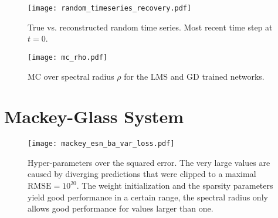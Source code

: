 \begin{figure}
  \begin{minipage}[t]{.48\textwidth}
    \texttt{[image: random\_timeseries\_recovery.pdf]}
    \caption{
      True vs. reconstructed random time series. Most recent time step at $t=0$.
    }
    \label{fig:random_timeseries_recovery}
  \end{minipage}
  \hspace{.02\textwidth}
  \begin{minipage}[t]{.48\textwidth}
    \texttt{[image: mc\_rho.pdf]}
    \caption{MC over spectral radius $\rho$ for the LMS and GD trained networks.}
    \label{fig:mc_rho}
  \end{minipage}
\end{figure}



\newpage
\section{Mackey-Glass System}%
\label{sec:res_mackey_glass_system}

\begin{figure}
  \centering
  \texttt{[image: mackey\_esn\_ba\_var\_loss.pdf]}
  \caption{Hyper-parameters over the squared error. The very large values
  are caused by diverging predictions that were clipped to a maximal
  $\mathrm{RMSE}=10^{20}$. The weight initialization and the sparsity
  parameters yield good performance in a certain range, the spectral radius
  only allows good performance for values larger than one.}
  \label{fig:mackey_esn_ba_var_loss}
\end{figure}


